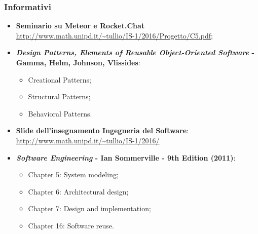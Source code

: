 \subsubsection{Informativi}
\begin{itemize}
	\item \textbf{Seminario su Meteor e Rocket.Chat}\\ \url{http://www.math.unipd.it/~tullio/IS-1/2016/Progetto/C5.pdf};
	\item \textbf{\textit{Design Patterns, Elements of Reusable Object-Oriented Software} - Gamma, Helm, Johnson, Vlissides}:
	\begin{itemize}
		\item Creational Patterns;
		\item Structural Patterns;
		\item Behavioral Patterns.
	\end{itemize}
	\item \textbf{Slide dell'insegnamento Ingegneria del Software}:
		\url{http://www.math.unipd.it/~tullio/IS-1/2016/}
	\item \textbf{\textit{Software Engineering} - Ian Sommerville - 9th Edition (2011)}:
	\begin{itemize}
		\item Chapter 5: System modeling;
		\item Chapter 6: Architectural design;
		\item Chapter 7: Design and implementation;
		\item Chapter 16: Software reuse.
	\end{itemize}  
\end{itemize}